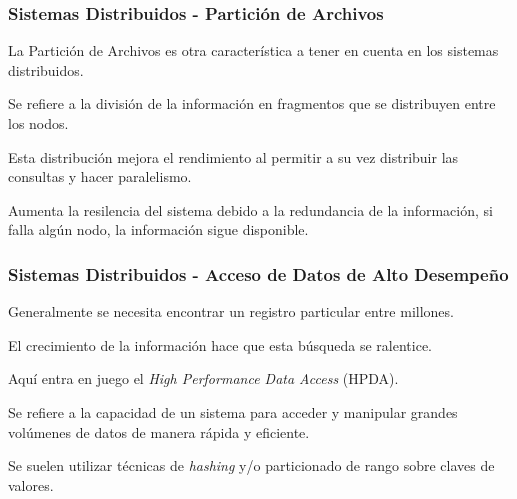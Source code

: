 \begin{frame}
    \frametitle{Sistemas Distribuidos - Partición de Archivos}

    La Partición de Archivos es otra característica a tener en cuenta en los sistemas distribuidos.

     

    Se refiere a la división de la información en fragmentos que se distribuyen entre los nodos.

     

    Esta distribución mejora el rendimiento al permitir a su vez distribuir las consultas y hacer paralelismo. 

     

    Aumenta la resilencia del sistema debido a la redundancia de la información, si falla algún nodo, la información sigue disponible.
    
\end{frame}

\begin{frame}
    \frametitle{Sistemas Distribuidos - Acceso de Datos de Alto Desempeño}

    Generalmente se necesita encontrar un registro particular entre millones.

     

    El crecimiento de la información hace que esta búsqueda se ralentice.

     

    Aquí entra en juego el \textit{High Performance Data Access} (HPDA).

     

    Se refiere a la capacidad de un sistema para acceder y manipular grandes volúmenes de datos de manera rápida y eficiente.

     

    Se suelen utilizar técnicas de \textit{hashing} y/o particionado de rango sobre claves de valores.
    
\end{frame}

